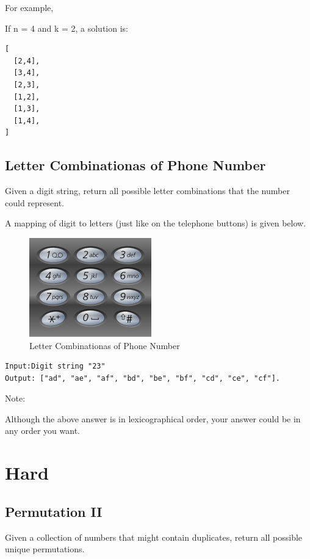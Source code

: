 \documentclass[12pt]{book}
\begin{document}
For example,

If n = 4 and k = 2, a solution is:
\lstset{language=java,label= ,caption= ,numbers=none}
\begin{lstlisting}
[
  [2,4],
  [3,4],
  [2,3],
  [1,2],
  [1,3],
  [1,4],
]
\end{lstlisting}

\subsection{Letter Combinationas of Phone Number}
\label{sec-9-1-5}
Given a digit string, return all possible letter combinations that the number could represent.

A mapping of digit to letters (just like on the telephone buttons) is given below.

\begin{figure}[htb]
\centering
\includegraphics[width=.9\linewidth]{./pic/phoneNumber.png}
\caption{Letter Combinationas of Phone Number}
\end{figure}
\lstset{language=java,label= ,caption= ,numbers=none}
\begin{lstlisting}
Input:Digit string "23"
Output: ["ad", "ae", "af", "bd", "be", "bf", "cd", "ce", "cf"].
\end{lstlisting}
Note:

Although the above answer is in lexicographical order, your answer could be in any order you want.
\section{Hard}
\label{sec-9-2}
\subsection{Permutation II}
\label{sec-9-2-1}
Given a collection of numbers that might contain duplicates, return all possible unique permutations.
\end{document}
